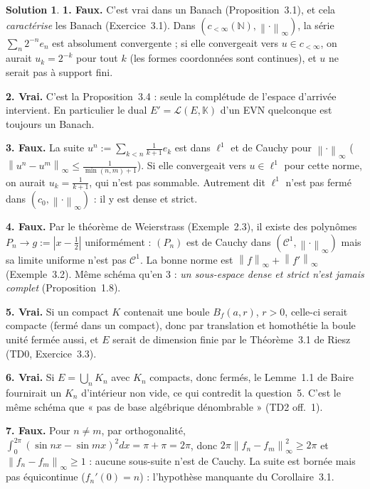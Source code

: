 \documentclass[11pt,a4paper]{article}
\newcommand{\N}{\mathbb{N}}
\newcommand{\K}{\mathbb{K}}
\newcommand{\Bf}{B_f}
\newcommand{\norm}[1]{\left\|#1\right\|}
\newcommand{\Lc}{\mathcal{L}}
\theoremstyle{definition}
\newtheorem*{solution}{Solution}
\begin{document}
\begin{solution}
\noindent\textbf{1. Faux.} C'est vrai dans un Banach (Proposition~3.1), et cela \emph{caractérise} les Banach (Exercice~3.1). Dans $(c_{<\infty}(\N),\norm\cdot_\infty)$, la série $\sum_n2^{-n}e_n$ est absolument convergente ; si elle convergeait vers $u\in c_{<\infty}$, on aurait $u_k=2^{-k}$ pour tout $k$ (les formes coordonnées sont continues), et $u$ ne serait pas à support fini.

\medskip
\noindent\textbf{2. Vrai.} C'est la Proposition~3.4 : seule la complétude de l'espace d'arrivée intervient. En particulier le dual $E'=\Lc(E,\K)$ d'un EVN quelconque est toujours un Banach.

\medskip
\noindent\textbf{3. Faux.} La suite $u^n:=\sum_{k<n}\frac1{k+1}e_k$ est dans $\ell^1$ et de Cauchy pour $\norm\cdot_\infty$ ($\norm{u^n-u^m}_\infty\le\frac1{\min(n,m)+1}$). Si elle convergeait vers $u\in\ell^1$ pour cette norme, on aurait $u_k=\frac1{k+1}$, qui n'est pas sommable. Autrement dit $\ell^1$ n'est pas fermé dans $(c_0,\norm\cdot_\infty)$ : il y est dense et strict.

\medskip
\noindent\textbf{4. Faux.} Par le théorème de Weierstrass (Exemple~2.3), il existe des polynômes $P_n\to g:=|x-\frac12|$ uniformément : $(P_n)$ est de Cauchy dans $(\mathcal C^1,\norm\cdot_\infty)$ mais sa limite uniforme n'est pas $\mathcal C^1$. La bonne norme est $\norm f_\infty+\norm{f'}_\infty$ (Exemple~3.2). Même schéma qu'en 3 : \emph{un sous-espace dense et strict n'est jamais complet} (Proposition~1.8).

\medskip
\noindent\textbf{5. Vrai.} Si un compact $K$ contenait une boule $\Bf(a,r)$, $r>0$, celle-ci serait compacte (fermé dans un compact), donc par translation et homothétie la boule unité fermée aussi, et $E$ serait de dimension finie par le Théorème~3.1 de Riesz (TD0, Exercice~3.3).

\medskip
\noindent\textbf{6. Vrai.} Si $E=\bigcup_nK_n$ avec $K_n$ compacts, donc fermés, le Lemme~1.1 de Baire fournirait un $K_n$ d'intérieur non vide, ce qui contredit la question~5. C'est le même schéma que « pas de base algébrique dénombrable » (TD2 off.~1).

\medskip
\noindent\textbf{7. Faux.} Pour $n\ne m$, par orthogonalité, $\int_0^{2\pi}(\sin nx-\sin mx)^2dx=\pi+\pi=2\pi$, donc $2\pi\norm{f_n-f_m}_\infty^2\ge2\pi$ et $\norm{f_n-f_m}_\infty\ge1$ : aucune sous-suite n'est de Cauchy. La suite est bornée mais pas équicontinue ($f_n'(0)=n$) : l'hypothèse manquante du Corollaire~3.1.


\end{solution}
\end{document}
